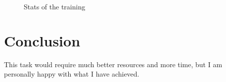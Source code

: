 \documentclass{article}
\begin{document}
\begin{figure}%
    \centering
    \qquad
    \caption{Stats of the training}%
    \label{fig:training-stats}%
\end{figure}

\section{Conclusion}
	This task would require much better resources and more time, but I am personally happy with what I have achieved.
\end{document}
